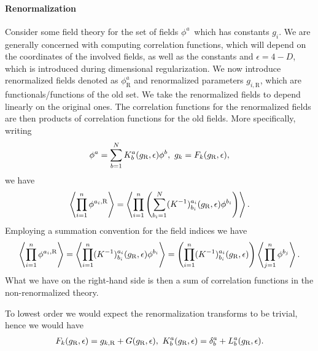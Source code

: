 \paragraph{Renormalization}
Consider some field theory for the set of fields $\phi^{a}$ which has constants $g_{i}$. We are generally concerned with computing correlation functions, which will depend on the coordinates of the involved fields, as well as the constants and $\epsilon = 4 - D$, which is introduced during dimensional regularization. We now introduce renormalized fields denoted as $\phi^{a}_{\text{R}}$ and renormalized parameters $g_{i, \text{R}}$, which are functionals/functions of the old set. We take the renormalized fields to depend linearly on the original ones. The correlation functions for the renormalized fields are then products of correlation functions for the old fields. More specifically, writing
\begin{align*}
	\phi^{a} = \sum\limits_{b = 1}^{N}K_{b}^{a}(g_{\text{R}}, \epsilon)\phi^{b},\ g_{k} = F_{k}(g_{\text{R}}, \epsilon),
\end{align*}
we have
\begin{align*}
	\expval{\prod\limits_{i = 1}^{n}\phi^{a_{i}, \text{R}}} = \expval{\prod\limits_{i = 1}^{n}\left(\sum\limits_{b_{i} = 1}^{N}(K^{-1})_{b_{i}}^{a_{i}}(g_{\text{R}}, \epsilon)\phi^{b_{i}}\right)}.
\end{align*}
Employing a summation convention for the field indices we have
\begin{align*}
	\expval{\prod\limits_{i = 1}^{n}\phi^{a_{i}, \text{R}}} = \expval{\prod\limits_{i = 1}^{n}(K^{-1})_{b_{i}}^{a_{i}}(g_{\text{R}}, \epsilon)\phi^{b_{i}}} = \left(\prod\limits_{i = 1}^{n}(K^{-1})_{b_{i}}^{a_{i}}(g_{\text{R}}, \epsilon)\right)\expval{\prod\limits_{j = 1}^{n}\phi^{b_{j}}}.
\end{align*}
What we have on the right-hand side is then a sum of correlation functions in the non-renormalized theory.

To lowest order we would expect the renormalization transforms to be trivial, hence we would have
\begin{align*}
	F_{k}(g_{\ren}, \epsilon) = g_{k, \ren} + G(g_{\ren}, \epsilon),\ K^{a}_{b}(g_{\ren}, \epsilon) = \kdelta{a}{b} + L^{a}_{b}(g_{\ren}, \epsilon).
\end{align*}

